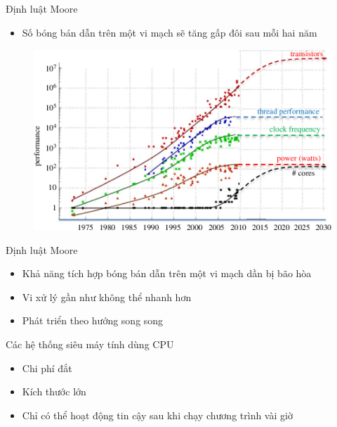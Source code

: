 \documentclass[10pt]{beamer}
\theoremstyle{remark}
\numberwithin{algocf}{section}
\numberwithin{equation}{section}
\numberwithin{dl}{section}
\numberwithin{figure}{section}
\begin{document}
\begin{frame}{Định luật Moore}
    \begin{itemize}
        \item Số bóng bán dẫn trên một vi mạch sẽ tăng gấp đôi sau mỗi hai năm
    \end{itemize}
    \begin{figure}[H]
        \centering
        \includegraphics[height=0.7\textheight]{figures/CUDA/Moore_Law.png}
    \end{figure}
\end{frame}

\begin{frame}{Định luật Moore}
    \begin{itemize}
        \item Khả năng tích hợp bóng bán dẫn trên một vi mạch dần bị bão hòa
        \item Vi xử lý gần như không thể nhanh hơn
        \item Phát triển theo hướng song song
    \end{itemize}
\end{frame}

\begin{frame}{Các hệ thống siêu máy tính dùng CPU}
    \begin{itemize}
        \item Chi phí đắt
        \item Kích thước lớn
        \item Chỉ có thể hoạt động tin cậy sau khi chạy chương trình vài giờ
    \end{itemize}
\end{frame}
\end{document}
